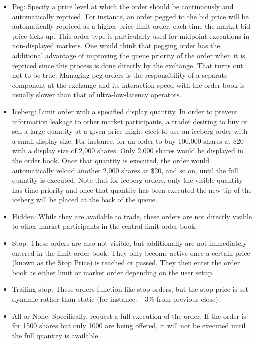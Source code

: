 \begin{itemize}
\item Peg: Specify a price level at which the order should be continuously and automatically repriced. For instance, an order pegged to the bid price will be automatically repriced as a higher price limit order, each time the market bid price ticks up. This order type is particularly used for midpoint executions in non-displayed markets. One would think that pegging order has the additional advantage of improving the queue priority of the order when it is repriced since this process is done directly by the exchange. That turns out not to be true. Managing peg orders is the responsibility of a separate component at the exchange and its interaction speed with the order book is usually slower than that of ultra-low-latency operators.

\item Iceberg: Limit order with a specified display quantity. In order to prevent information leakage to other market participants, a trader desiring to buy or sell a large quantity at a given price might elect to use an iceberg order with a small display size. For instance, for an order to buy 100,000 shares at \$20 with a display size of 2,000 shares. Only 2,000 shares would be displayed in the order book. Once that quantity is executed, the order would automatically reload another 2,000 shares at \$20, and so on, until the full quantity is executed. Note that for iceberg orders, only the visible quantity has time priority and once that quantity has been executed the new tip of the iceberg will be placed at the back of the queue.

\item Hidden: While they are available to trade, these orders are not directly visible to other market participants in the central limit order book. 

\item Stop: These orders are also not visible, but additionally are not immediately entered in the limit order book. They only become active once a certain price (known as the Stop Price) is reached or passed. They then enter the order book as either limit or market order depending on the user setup.

\item Trailing stop: These orders function like stop orders, but the stop price is set dynamic rather than static (for instance: $-3\%$ from previous close).

\item All-or-None: Specifically, request a full execution of the order. If the order is for 1500 shares but only 1000 are being offered, it will not be executed until the full quantity is available.


\end{itemize}
